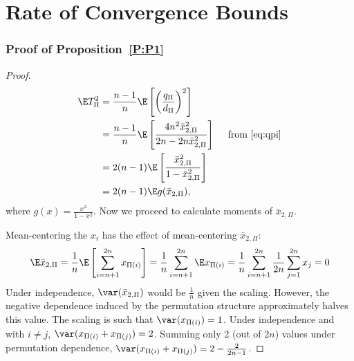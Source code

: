 \chapter{Rate of Convergence Bounds}
\label{A:stein-proof-app}
\subsection{Proof of Proposition~\ref{P:P1}}
\begin{proof}
  \begin{align}
    \E T_{\Pi}^2
    &= \frac{n-1}{n} \E \left [ \left ( \frac{q_\Pi}{d_\Pi} \right )^2 \right ] \\
    &= \frac{n-1}{n} \E \left [\frac{
        4 n^2\bar{x}_{2,\Pi}^2}{2n-2n\bar{x}_{2,\Pi}^2} \right ] \quad \text{ from } \eqref{eq:qpi}
    \nonumber \\
    &= 2(n-1)\E \left [\frac{
        \bar{x}_{2,\Pi}^2}{1-\bar{x}_{2,\Pi}^2} \right ] \nonumber \\
    &= 2(n-1) \E g(\bar{x}_{2,\Pi}), \label{def:varT}
  \end{align}
  where $g(x) = \frac{x^2}{1-x^2}$. Now we proceed to calculate moments of $\bar{x}_{2,\Pi}$.

  Mean-centering the $x_{i}$ has the effect of mean-centering $\bar{x}_{2,\Pi}$:
  \begin{equation*}
    \E \bar{x}_{2,\Pi} =
    \frac{1}{n} \E \left [ \sum_{i=n+1}^{2n} x_{\Pi(i)} \right ] =
    \frac{1}{n} \sum_{i=n+1}^{2n} \E x_{\Pi(i)} =
    \frac{1}{n} \sum_{i=n+1}^{2n} \frac{1}{2n} \sum_{j=1}^{2n} x_{j} = 0
  \end{equation*}
  Under independence, $\var(\bar{x}_{2,\Pi})$ would be $\frac{1}{n}$ given
  the scaling.  However, the negative dependence induced by the
  permutation structure approximately halves this value.
  The scaling is such that $\var(x_{\Pi(i)}) = 1$.  Under independence and
  with $i \neq j$, $\var(x_{\Pi(i)} + x_{\Pi(j)}) = 2$.  Summing only 2 (out of $2n$)
  values under permutation dependence, $\var(x_{\Pi(i)} + x_{\Pi(j)}) = 2 - \frac{2}{2n-1}$.


\end{proof}
